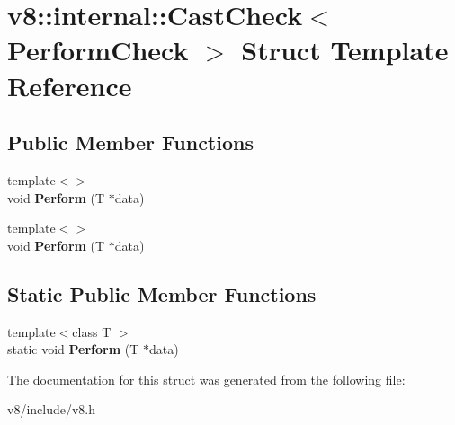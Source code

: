 \hypertarget{structv8_1_1internal_1_1CastCheck}{}\section{v8\+:\+:internal\+:\+:Cast\+Check$<$ Perform\+Check $>$ Struct Template Reference}
\label{structv8_1_1internal_1_1CastCheck}
\subsection*{Public Member Functions}
\begin{DoxyCompactItemize}
\item 
\mbox{\label{structv8_1_1internal_1_1CastCheck_a0a213344d48ca226529f7ebd6edd6f3e}} 
{\footnotesize template$<$$>$ }\\void {\bfseries Perform} (T $\ast$data)
\item 
\mbox{\label{structv8_1_1internal_1_1CastCheck_ab169a4db19476037fa7f64bb2f5b1ccf}} 
{\footnotesize template$<$$>$ }\\void {\bfseries Perform} (T $\ast$data)
\end{DoxyCompactItemize}
\subsection*{Static Public Member Functions}
\begin{DoxyCompactItemize}
\item 
\mbox{\label{structv8_1_1internal_1_1CastCheck_a79edb0718f67826a1c2c1eba5a5a9bf5}} 
{\footnotesize template$<$class T $>$ }\\static void {\bfseries Perform} (T $\ast$data)
\end{DoxyCompactItemize}


The documentation for this struct was generated from the following file\+:\begin{DoxyCompactItemize}
\item 
v8/include/v8.\+h\end{DoxyCompactItemize}

